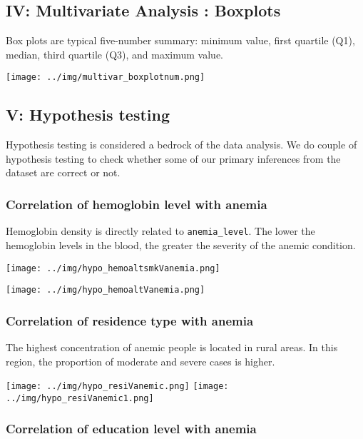 \subsection{IV: Multivariate Analysis : Boxplots}

Box plots are typical five-number summary: minimum value, first quartile (Q1), median, third quartile (Q3), and maximum value.

\texttt{[image: ../img/multivar\_boxplotnum.png]}



\newpage

\subsection{V: Hypothesis testing}


Hypothesis testing is considered a bedrock of the data analysis. We do couple of hypothesis testing to check whether some of our primary inferences from the dataset are correct or not.

\subsubsection{Correlation of hemoglobin level with anemia}


Hemoglobin density is directly related to \texttt{anemia\_level}. The lower the hemoglobin levels in the blood, the greater the severity of the anemic condition.


\texttt{[image: ../img/hypo\_hemoaltsmkVanemia.png]}

\texttt{[image: ../img/hypo\_hemoaltVanemia.png]}

\newpage

\subsubsection{Correlation of residence type with anemia}

The highest concentration of anemic people is located in rural areas. In this region, the proportion of moderate and severe cases is higher.

\texttt{[image: ../img/hypo\_resiVanemic.png]}
\texttt{[image: ../img/hypo\_resiVanemic1.png]}

\newpage

\subsubsection{Correlation of education level with anemia}

